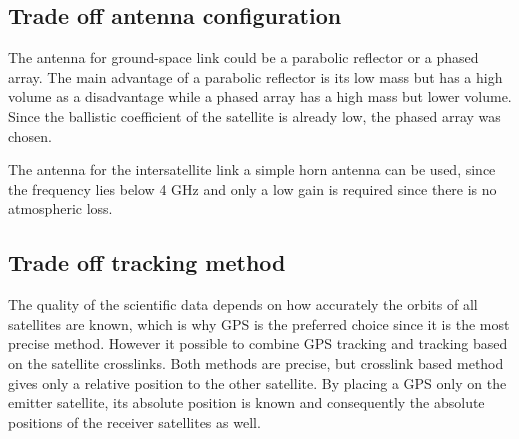 \subsection{Trade off antenna configuration}
The antenna for ground-space link could be a parabolic reflector or a phased array. The main advantage of a parabolic reflector is its low mass but has a high volume as a disadvantage while a phased array has a high mass but lower volume. Since the ballistic coefficient of the satellite is already low, the phased array was chosen.

The antenna for the intersatellite link a simple horn antenna can be used, since the frequency lies below 4 GHz and only a low gain is required since there is no atmospheric loss.

\subsection{Trade off tracking method}
\label{TOcommTA}
The quality of the scientific data depends on how accurately the orbits of all satellites are known, which is why GPS is the preferred choice since it is the most precise method. However it possible to combine GPS tracking and tracking based on the satellite crosslinks. Both methods are precise, but crosslink based method gives only a relative position to the other satellite. By placing a GPS only on the emitter satellite, its absolute position is known and consequently the absolute positions of the receiver satellites as well.
